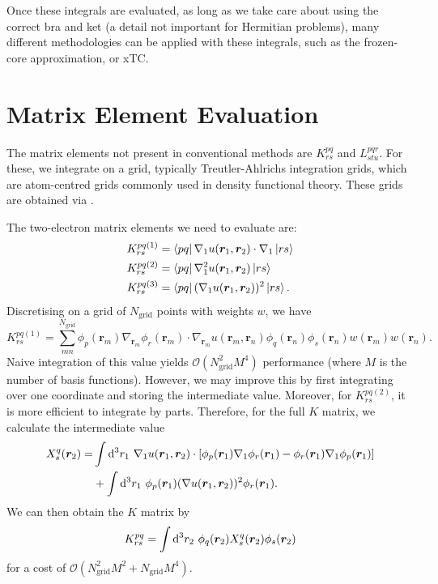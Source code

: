 Once these integrals are evaluated, as long as we take care about using the correct bra and ket (a detail not important for Hermitian problems), many different methodologies can be applied with these integrals, such as the frozen-core approximation,\supercite{finkApproach1972,baerendsSelfconsistent1973,sachsFrozen1975} or \gls{xTC}.\supercite{christlmaierXTC2023}

\section{Matrix Element Evaluation}
The matrix elements not present in conventional methods are $K_{rs}^{pq}$ and $L_{stu}^{pqr}$. For these, we integrate on a grid, typically Treutler-Ahlrichs integration grids,
\supercite{beckeMulticenter1988,treutlerEfficient1995} which are atom-centred grids commonly used in density functional theory. These grids are obtained via \pyscf.

The two-electron matrix elements we need to evaluate are:
\begin{align}
    K_{rs}^{pq(1)} &= \bra{pq}\nabla_1u(\bm r_1, \bm r_2)\cdot\nabla_1\ket{rs}\\
    K_{rs}^{pq(2)} &= \bra{pq}\nabla_1^2u(\bm r_1, \bm r_2)\ket{rs}\\
    K_{rs}^{pq(3)} &= \bra{pq}(\nabla_1u(\bm r_1, \bm r_2))^2\ket{rs}.
\end{align}
Discretising on a grid of $N_\mathrm{grid}$ points with weights $w$, we have
\begin{equation}
    K_{rs}^{pq(1)} = \sum_{mn}^{N_\mathrm{grid}}
    \phi_p(\bm r_m)\nabla_{\bm r_m}\phi_r(\bm r_m)\cdot \nabla_{\bm r_m}u(\bm r_m, \bm r_n)\phi_q(\bm r_n)\phi_s(\bm r_n)w(\bm r_m)w(\bm r_n).
\end{equation}
Naive integration of this value yields $\mathcal{O}(N_\mathrm{grid}^2M^4)$ performance (where $M$ is the number of basis functions). However, we may improve this by first integrating over one coordinate and storing the intermediate value. Moreover, for $K_{rs}^{pq(2)}$, it is more efficient to integrate by parts. Therefore, for the full $K$ matrix, we calculate the intermediate value
\begin{align}
    X_s^q(\bm r_2) =& \int\mathrm{d}^3 r_1\ \nabla_1u(\bm r_1, \bm r_2)\cdot[\phi_p(\bm r_1) \nabla_1\phi_r(\bm r_1) - \phi_r(\bm r_1)
\nabla_1\phi_p(\bm r_1)]  \\
&+ \int\mathrm{d}^3 r_1\ \phi_p(\bm r_1)(\nabla u(\bm r_1, \bm r_2))^2 \phi_r(\bm r_1).
\end{align}
We can then obtain the $K$ matrix by
\begin{equation}
    K_{rs}^{pq} = \int\d^3 r_2\ \phi_q(\bm r_2)X_s^q(\bm r_2)\phi_s(\bm r_2)
\end{equation}
for a cost of $\mathcal{O}(N_\mathrm{grid}^2M^2+N_\mathrm{grid}M^4)$.

